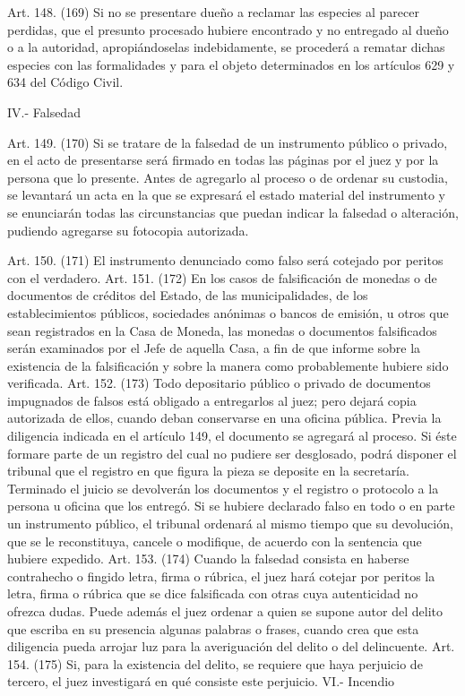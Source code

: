     Art. 148. (169) Si no se presentare dueño a reclamar las especies al parecer perdidas, que el presunto procesado hubiere encontrado y no entregado al dueño o a la autoridad, apropiándoselas indebidamente, se procederá a rematar dichas especies con las formalidades y para el objeto determinados en los artículos 629 y 634 del Código Civil.


    IV.- Falsedad

    Art. 149. (170) Si se tratare de la falsedad de un instrumento público o privado, en el acto de presentarse será firmado en todas las páginas por el juez y por la persona que lo presente.
    Antes de agregarlo al proceso o de ordenar su custodia, se levantará un acta en la que se expresará el estado material del instrumento y se enunciarán todas las circunstancias que puedan indicar la falsedad o alteración, pudiendo agregarse su fotocopia autorizada.

    Art. 150. (171) El instrumento denunciado como falso será cotejado por peritos con el verdadero.
    Art. 151. (172) En los casos de falsificación de monedas o de documentos de créditos del Estado, de las municipalidades, de los establecimientos públicos, sociedades anónimas o bancos de emisión, u otros que sean registrados en la Casa de Moneda, las monedas o documentos falsificados serán examinados por el Jefe de aquella Casa, a fin de que informe sobre la existencia de la falsificación y sobre la manera como probablemente hubiere sido verificada.
    Art. 152. (173) Todo depositario público o privado de documentos impugnados de falsos está obligado a entregarlos al juez; pero dejará copia autorizada de ellos, cuando deban conservarse en una oficina pública.
    Previa la diligencia indicada en el artículo 149, el documento se agregará al proceso.
    Si éste formare parte de un registro del cual no pudiere ser desglosado, podrá disponer el tribunal que el registro en que figura la pieza se deposite en la secretaría.
    Terminado el juicio se devolverán los documentos y el registro o protocolo a la persona u oficina que los entregó.
    Si se hubiere declarado falso en todo o en parte un instrumento público, el tribunal ordenará al mismo tiempo que su devolución, que se le reconstituya, cancele o modifique, de acuerdo con la sentencia que hubiere expedido.
    Art. 153. (174) Cuando la falsedad consista en haberse contrahecho o fingido letra, firma o rúbrica, el juez hará cotejar por peritos la letra, firma o rúbrica que se dice falsificada con otras cuya autenticidad no ofrezca dudas.
    Puede además el juez ordenar a quien se supone autor del delito que escriba en su presencia algunas palabras o frases, cuando crea que esta diligencia pueda arrojar luz para la averiguación del delito o del delincuente.
    Art. 154. (175) Si, para la existencia del delito, se requiere que haya perjuicio de tercero, el juez investigará en qué consiste este perjuicio.
    VI.- Incendio

